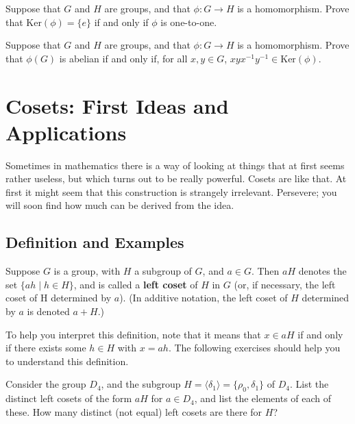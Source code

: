 \begin{problem}\label{prob:kerneltest}
Suppose that \(G\) and \(H\) are groups, and that \(\phi : G \longrightarrow H\) is a homomorphism. Prove that \(\mbox{Ker}(\phi) = \{e\}\) if and only if \(\phi\) is one-to-one.
\begin{annotation}
\end{annotation}
\end{problem}

\begin{problem}
Suppose that \(G\) and \(H\) are groups, and that \(\phi : G \longrightarrow H\) is a homomorphism. Prove that \(\phi(G)\) is abelian if and only if, for all \(x,y\in G\), \(xyx^{-1}y^{-1} \in \mbox{Ker}(\phi) \).
\end{problem}

\chapter{Cosets: First Ideas and Applications}\label{chap:cosets}

Sometimes in mathematics there is a way of looking at things that at first seems rather useless, but which turns out to be really powerful. Cosets are like that. At first it might seem that this construction is strangely irrelevant. Persevere; you will soon find how much can be derived from the idea.

\section{Definition and Examples}

\begin{definition}
Suppose \(G\) is a group, with \(H\) a subgroup of \(G\), and \( a \in G\).  Then \(aH\) denotes the set \(\{ah \mid h \in H\}\), and is called a \textbf{left coset} of \(H\) in \(G\) (or, if necessary, the left coset of H determined by \(a\)).
(In additive notation, the left coset of \(H\) determined by \(a\) is denoted \(a+H\).)
\end{definition}

To help you interpret this definition, note that it means that \(x \in aH \) if and only if there exists some \(h \in H\) with \(x = ah\).
The following exercises should help you to understand this definition.

\begin{problem}
Consider the group \(D_4\), and the subgroup \(H = \langle \delta_1 \rangle = \{\rho_0,\delta_1\} \) of \(D_4\). List the distinct left cosets of the form \(aH\) for \(a \in D_4\), and list the elements of each of these. How many distinct (not equal) left cosets are there for \(H\)?
\end{problem}


